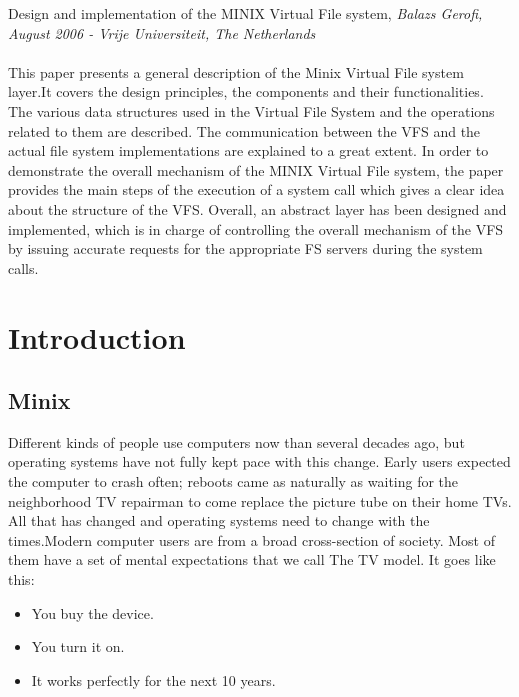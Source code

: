 
\vspace{10mm}
 Design and implementation of the MINIX Virtual File system, { \em Balazs Gerofi, August 2006 - Vrije Universiteit, The Netherlands
}\cite{vfs}
\\
\\
This paper presents a general description of the Minix Virtual File system layer.It covers the design principles, the components and their functionalities.
The various data structures used in the Virtual File System and the operations related to them are described. The communication between the VFS and the actual file system implementations are explained to a great extent.
In order to demonstrate the overall mechanism of the MINIX Virtual File system, the paper provides the main steps of the execution of a system call which gives a clear idea about the structure of the VFS.
Overall, an abstract layer has been designed and implemented, which is in charge of controlling the overall mechanism of the VFS by issuing accurate requests for the appropriate FS servers during the system calls.

\chapter{Introduction}
\section{Minix}

Different kinds of people use computers now than sev­eral decades ago, but operating systems have not fully kept pace with this change. Early users expected the computer to crash often; reboots came as naturally as waiting for the neighborhood TV re­pairman to come replace the picture tube on their home TVs. All that has changed and operating systems need to change with the times.Modern computer users are from a broad cross-section of society. Most of them have a set of mental expectations that we call The TV model.
It goes like this:
\begin{itemize}
\item You buy the device.
\item You turn it on.
\item It works perfectly for the next 10 years.
\end{itemize}

